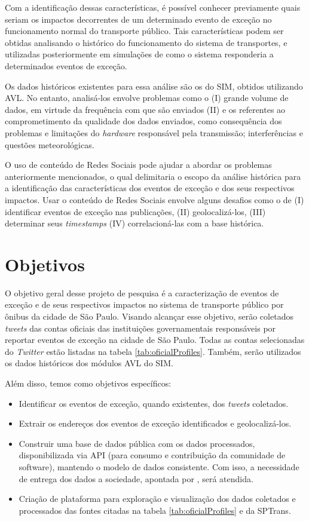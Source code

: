 \documentclass[
	12pt,				%
	oneside,			%
	a4paper,			%
	english,			%
	brazil				%
	]{abntex2ppgsi}
\begin{document}
Com a identificação dessas características, é possível conhecer previamente quais seriam os impactos decorrentes de um determinado evento de exceção no funcionamento normal do transporte público. Tais características podem ser obtidas analisando o histórico do funcionamento do sistema de transportes, e utilizadas posteriormente em simulações de como o sistema responderia a determinados eventos de exceção.

Os dados históricos existentes para essa análise são os do SIM, obtidos utilizando AVL. No entanto, analisá-los envolve problemas como o (I) grande volume de dados, em virtude da frequência com que são enviados (II) e os referentes ao comprometimento da qualidade dos dados enviados, como consequência dos problemas e limitações do \textit{hardware} responsável pela transmissão; interferências e questões meteorológicas. 

O uso de conteúdo de Redes Sociais pode ajudar a abordar os problemas anteriormente mencionados, o qual delimitaria o escopo da análise histórica para a identificação das características dos eventos de exceção e dos seus respectivos impactos. Usar o conteúdo de Redes Sociais envolve alguns desafios como o de (I) identificar eventos de exceção nas publicações, (II) geolocalizá-los, (III) determinar seus \textit{timestamps} (IV) correlacioná-las com a base histórica.  

\section{Objetivos}
\label{objetivos}
O objetivo geral desse projeto de pesquisa é a caracterização de eventos de exceção e de seus respectivos impactos no sistema de transporte público por ônibus da cidade de São Paulo. Visando alcançar esse objetivo, serão coletados \textit{tweets} das contas oficiais das instituições governamentais responsáveis por reportar eventos de exceção na
cidade de São Paulo. Todas as contas selecionadas do \textit{Twitter} estão listadas na tabela \ref{tab:oficialProfiles}. Também, serão utilizados os dados históricos dos módulos AVL do SIM. 

Além disso, temos como objetivos específicos:

\begin{itemize}
    \item Identificar os eventos de exceção, quando existentes, dos \textit{tweets} coletados.
     \item Extrair os endereços dos eventos de exceção identificados e geolocalizá-los.
		\item Construir uma base de dados pública com os dados processados, disponibilizada via API (para consumo e contribuição da comunidade de software), mantendo o modelo de dados consistente. Com isso, a necessidade de entrega dos dados a sociedade, apontada por \cite{kuflik2017automating}, será atendida.
\item Criação de plataforma para exploração e visualização dos dados coletados e processados das fontes citadas na tabela \ref{tab:oficialProfiles} e da SPTrans.
\end{itemize}
\end{document}
